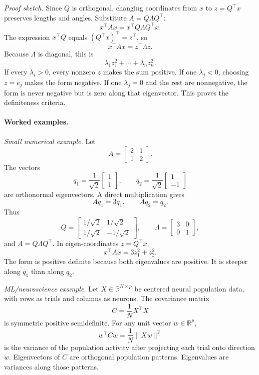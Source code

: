 \emph{Proof sketch.} Since \(Q\) is orthogonal, changing coordinates from \(x\) to \(z=Q^\top x\) preserves lengths and angles. Substitute \(A=Q\Lambda Q^\top\):
\[
x^\top A x
=x^\top Q\Lambda Q^\top x.
\]
The expression \(x^\top Q\) equals \((Q^\top x)^\top=z^\top\), so
\[
x^\top A x=z^\top\Lambda z.
\]
Because \(\Lambda\) is diagonal, this is
\[
\lambda_1z_1^2+\cdots+\lambda_nz_n^2.
\]
If every \(\lambda_i>0\), every nonzero \(z\) makes the sum positive. If one \(\lambda_j<0\), choosing \(z=e_j\) makes the form negative. If one \(\lambda_j=0\) and the rest are nonnegative, the form is never negative but is zero along that eigenvector. This proves the definiteness criteria.

\paragraph{Worked examples.}
\emph{Small numerical example.} Let
\[
A=
\begin{bmatrix}
2&1\\
1&2
\end{bmatrix}.
\]
The vectors
\[
q_1=\frac{1}{\sqrt2}\begin{bmatrix}1\\1\end{bmatrix},
\qquad
q_2=\frac{1}{\sqrt2}\begin{bmatrix}1\\-1\end{bmatrix}
\]
are orthonormal eigenvectors. A direct multiplication gives
\[
Aq_1=3q_1,
\qquad
Aq_2=q_2.
\]
Thus
\[
Q=
\begin{bmatrix}
1/\sqrt2&1/\sqrt2\\
1/\sqrt2&-1/\sqrt2
\end{bmatrix},
\qquad
\Lambda=
\begin{bmatrix}
3&0\\
0&1
\end{bmatrix},
\]
and \(A=Q\Lambda Q^\top\). In eigen-coordinates \(z=Q^\top x\),
\[
x^\top A x=3z_1^2+z_2^2.
\]
The form is positive definite because both eigenvalues are positive. It is steeper along \(q_1\) than along \(q_2\).

\emph{ML/neuroscience example.} Let \(X\in\mathbb{R}^{N\times p}\) be centered neural population data, with rows as trials and columns as neurons. The covariance matrix
\[
C=\frac{1}{N}X^\top X
\]
is symmetric positive semidefinite. For any unit vector \(w\in\mathbb{R}^p\),
\[
w^\top Cw
=\frac{1}{N}\|Xw\|^2
\]
is the variance of the population activity after projecting each trial onto direction \(w\). Eigenvectors of \(C\) are orthogonal population patterns. Eigenvalues are variances along those patterns.

